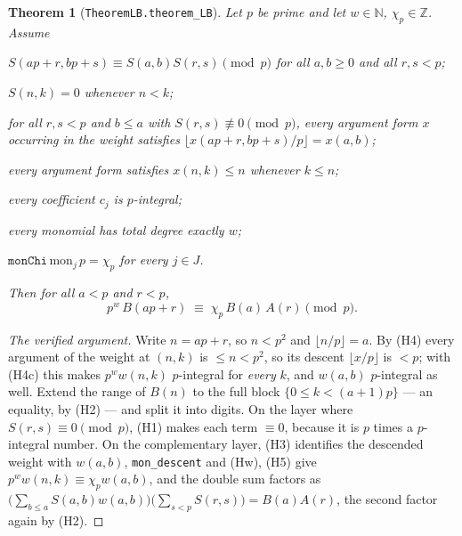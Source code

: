 \documentclass[11pt,reqno]{amsart}
\theoremstyle{plain}
\newtheorem{theorem}{Theorem}[section]
\theoremstyle{definition}
\theoremstyle{remark}
\newcommand{\Z}{\mathbb{Z}}
\newcommand{\N}{\mathbb{N}}
\newcommand{\Ln}[1]{\texttt{#1}}
\numberwithin{equation}{section}
\begin{document}
\begin{theorem}[\Ln{TheoremLB.theorem\_LB}]\label{thm:LB}
Let $p$ be prime and let $w\in\N$, $\chi_p\in\Z$. Assume
\begin{description}[leftmargin=3.2em,style=sameline]
\item[\textup{(H1)}] $S(ap+r,bp+s)\equiv S(a,b)S(r,s)\pmod p$ for \emph{all} $a,b\ge0$ and
  all $r,s<p$;
\item[\textup{(H2)}] $S(n,k)=0$ whenever $n<k$;
\item[\textup{(H3)}] for all $r,s<p$ and $b\le a$ with $S(r,s)\not\equiv0\pmod p$, every
  argument form $x$ occurring in the weight satisfies
  $\lfloor x(ap+r,bp+s)/p\rfloor=x(a,b)$;
\item[\textup{(H4)}] every argument form satisfies $x(n,k)\le n$ whenever $k\le n$;
\item[\textup{(H4c)}] every coefficient $c_j$ is $p$-integral;
\item[\textup{(Hw)}] every monomial has total degree exactly $w$;
\item[\textup{(H5)}] $\Ln{monChi}\,\mathrm{mon}_j\,p=\chi_p$ for every $j\in J$.
\end{description}
Then for all $a<p$ and $r<p$,
\[
   p^{w}\,B(ap+r)\;\equiv\;\chi_p\,B(a)\,A(r)\pmod p .
\]
\end{theorem}

\begin{proof}[The verified argument]
Write $n=ap+r$, so $n<p^2$ and $\lfloor n/p\rfloor=a$. By (H4) every argument of the weight
at $(n,k)$ is $\le n<p^2$, so its descent $\lfloor x/p\rfloor$ is $<p$; with (H4c) this makes
$p^ww(n,k)$ $p$-integral for \emph{every} $k$, and $w(a,b)$ $p$-integral as well. Extend the
range of $B(n)$ to the full block $\{0\le k<(a+1)p\}$ --- an equality, by (H2) --- and split
it into digits. On the layer where $S(r,s)\equiv0\pmod p$, (H1) makes each term $\equiv0$,
because it is $p$ times a $p$-integral number. On the complementary layer, (H3) identifies
the descended weight with $w(a,b)$, \Ln{mon\_descent} and (Hw), (H5) give
$p^ww(n,k)\equiv\chi_pw(a,b)$, and the double sum factors as
$\bigl(\sum_{b\le a}S(a,b)w(a,b)\bigr)\bigl(\sum_{s<p}S(r,s)\bigr)=B(a)A(r)$, the second
factor again by (H2).
\end{proof}
\end{document}
